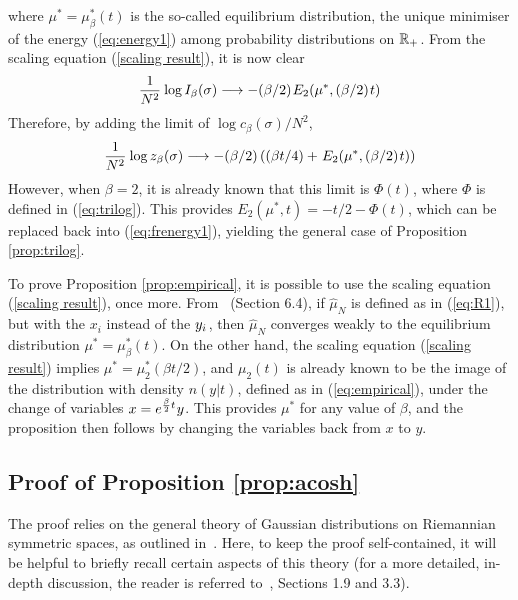 \documentclass[draftclsnofoot]{IEEEtran}
\begin{document}
where $\mu^* = \mu^*_\beta(t)$ is the so-called equilibrium distribution, the unique minimiser of the energy (\ref{eq:energy1}) among probability distributions on $\mathbb{R}_+\hspace{0.02cm}$. From the scaling equation (\ref{scaling result}), it is now clear
\begin{equation} \label{eq:frenergy}
\frac{1}{N^2}\hspace{0.02cm}\log I_\beta(\sigma) \longrightarrow - (\beta/2)\hspace{0.03cm}E_{2}\!\left(\mu^*,(\beta/2)\hspace{0.03cm} t\right) 
\end{equation}
Therefore, by adding the limit of $\log c_\beta(\sigma)/N^2$, 
\begin{equation} \label{eq:frenergy1}
\frac{1}{N^2}\hspace{0.02cm}\log z_\beta(\sigma) \longrightarrow - (\beta/2)\left((\beta t/4) + \hspace{0.03cm}E_{2}\!\left(\mu^*,(\beta/2)\hspace{0.03cm} t\right)\right)
\end{equation}
However, when $\beta = 2$, it is already known that this limit is $\Phi(t)$, where $\Phi$ is defined in (\ref{eq:trilog}). This provides $E_{2}\!\left(\mu^*, t\right) = -t/2 - \Phi(t)$, which can be replaced back into (\ref{eq:frenergy1}), yielding the general case of Proposition \ref{prop:trilog}. 

To prove Proposition \ref{prop:empirical}, it is possible to use the scaling equation (\ref{scaling result}), once more. From~\cite{deift} (Section 6.4), if $\hat{\mu}_{\scriptscriptstyle N}$ is defined as in (\ref{eq:R1}), but with the $x_i$ instead of the $y_i\hspace{0.02cm}$, then $\hat{\mu}_{\scriptscriptstyle N}$ converges weakly to the equilibrium distribution $\mu^* = \mu^*_\beta(t)$. On the other hand, the scaling equation (\ref{scaling result}) implies $\mu^* = \mu^*_2(\beta t/2)$, and $\mu_2(t)$ is already known to be the image of the distribution with density $n(y|t)$, defined as in (\ref{eq:empirical}), under the change of variables $x = e^{\frac{\beta}{2}t}\hspace{0.02cm}y$. This provides $\mu^*$ for any value of $\beta$, and the proposition then follows by changing the variables back from $x$ to $y$. 

\subsection{Proof of Proposition \ref{prop:acosh}} 
The proof relies on the general theory of Gaussian distributions on Riemannian symmetric spaces, as outlined in~\cite{Sa17}\cite{habilitation}. Here, to keep the proof self-contained, it will be helpful to briefly recall certain aspects of this theory (for a more detailed, in-depth discussion, the reader is referred to~\cite{habilitation}, Sections 1.9 and 3.3).
\end{document}
